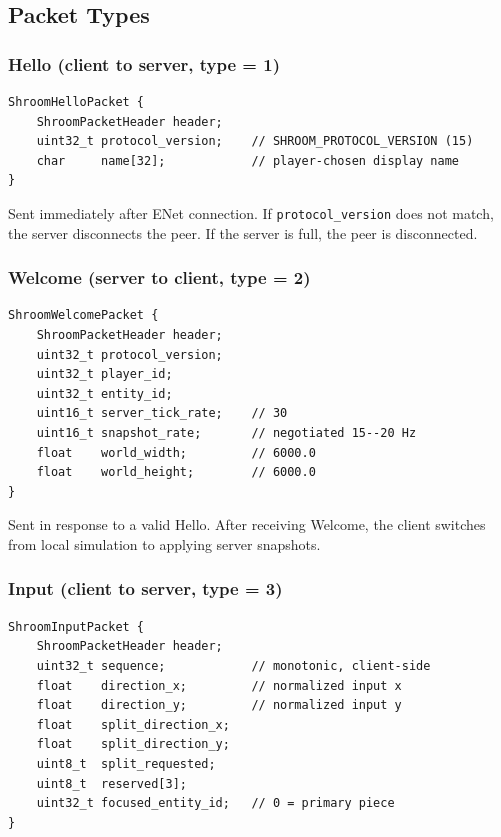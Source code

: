 \documentclass[11pt]{article}
\begin{document}
\subsection{Packet Types}

\subsubsection{Hello (client to server, type = 1)}

\begin{verbatim}
ShroomHelloPacket {
    ShroomPacketHeader header;
    uint32_t protocol_version;    // SHROOM_PROTOCOL_VERSION (15)
    char     name[32];            // player-chosen display name
}
\end{verbatim}

Sent immediately after ENet connection. If \texttt{protocol\_version} does not match, the server disconnects the peer. If the server is full, the peer is disconnected.

\subsubsection{Welcome (server to client, type = 2)}

\begin{verbatim}
ShroomWelcomePacket {
    ShroomPacketHeader header;
    uint32_t protocol_version;
    uint32_t player_id;
    uint32_t entity_id;
    uint16_t server_tick_rate;    // 30
    uint16_t snapshot_rate;       // negotiated 15--20 Hz
    float    world_width;         // 6000.0
    float    world_height;        // 6000.0
}
\end{verbatim}

Sent in response to a valid Hello. After receiving Welcome, the client switches from local simulation to applying server snapshots.

\subsubsection{Input (client to server, type = 3)}

\begin{verbatim}
ShroomInputPacket {
    ShroomPacketHeader header;
    uint32_t sequence;            // monotonic, client-side
    float    direction_x;         // normalized input x
    float    direction_y;         // normalized input y
    float    split_direction_x;
    float    split_direction_y;
    uint8_t  split_requested;
    uint8_t  reserved[3];
    uint32_t focused_entity_id;   // 0 = primary piece
}
\end{verbatim}
\end{document}
